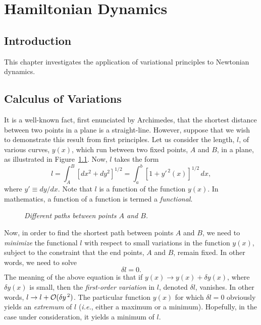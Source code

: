 \chapter{Hamiltonian Dynamics}
\section{Introduction} 
This chapter investigates the application of variational principles
to Newtonian dynamics. 

\section{Calculus of Variations}\label{s11.2}
It is a well-known fact, first enunciated by Archimedes, that the shortest
distance between two points in a plane is a straight-line. However, suppose that
we wish to demonstrate this result from first principles. Let us consider the
length, $l$, of various curves, $y(x)$, which run between two fixed
points, $A$ and $B$, in a plane, as illustrated in Figure~\ref{calv}. Now, $l$ takes the form
\begin{equation}\label{e11.1}
l = \int_A^B [dx^2 + dy^2]^{1/2} = \int_a^b [1 + y'^{\,2}(x)]^{1/2}\,dx,
\end{equation}
where $y'\equiv dy/dx$. Note that $l$ is a function of the function $y(x)$.
In mathematics, a function of a function is  termed a {\em functional}. 

\begin{figure}[h]
\epsfysize=2.5in
\centerline{}
\caption{\em Different paths between points $A$ and $B$.}\label{calv}
\end{figure}

Now, in order to find the shortest path between points $A$ and $B$, we need to {\em minimize}\/ the functional $l$ with respect to small variations
in the function $y(x)$, subject to the constraint that the end points, $A$
and $B$, remain fixed. In other words, we need to solve
\begin{equation}
\delta l = 0.
\end{equation}
The meaning of the above equation is that if $y(x)\rightarrow y(x)+\delta y(x)$, where $\delta y(x)$ is small, then the {\em first-order variation} in $l$,
denoted $\delta l$, 
vanishes. In other words, $l\rightarrow l + {\cal O}(\delta y^{\,2})$. The particular function
$y(x)$ for which $\delta l =0$ obviously yields an {\em extremum}\/ of $l$ ({\em i.e.}, either a maximum or a minimum). Hopefully,
in the  case under consideration, 
it yields a minimum of $l$.

